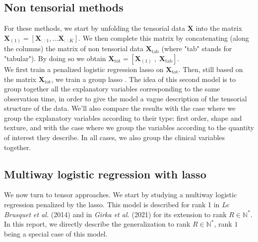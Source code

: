 \documentclass[10pt]{article}
\begin{document}
\subsection{Non tensorial methods}
For these methods, we start by unfolding the tensorial data $\underline{\mathbf{X}}$ into the matrix $\mathbf{X}_{(1)} = [\mathbf{X}_{:\,:1}, \ldots \mathbf{X}_{:\,:K}]$. We then complete this matrix  by concatenating (along the columns) the matrix of non tensorial data $\mathbf{X}_{\text{tab}}$ (where "tab" stands for "tabular"). By doing so we obtain $\mathbf{X}_{\text{tot}} = [\mathbf{X}_{(1)}  \; , \; \mathbf{X}_{\text{tab}}]$.\\
\indent We first train a penalized logistic regression lasso on $\mathbf{X}_{\text{tot}}$. Then, still based on the matrix $\mathbf{X}_{\text{tot}}$, we train a group lasso \cite{grp_lasso}. The idea of this second model is to group together all the explanatory variables corresponding to the same observation time, in order to give the model a vague description of the tensorial structure of the data. We'll also compare the results with the case where we group the explanatory variables according to their type: first order, shape and texture, and with the case where we group the variables according to the quantity of interest they describe. In all cases, we also group the clinical variables together.

\subsection{Multiway logistic regression with lasso}
\indent We now turn to tensor approaches. We start by studying a multiway logistic regression penalized by the lasso. This model is described for rank 1 in \textit{Le Brusquet et al.} (2014) \cite{multi_rank_1} and in \textit{Girka et al.} (2021) \cite{multi_rank_r} for its extension to rank $R \in \mathbb{N}^{*}$. In this report, we directly describe the generalization to rank $R \in \mathbb{N}^{*}$, rank $1$ being a special case of this model.\\[5 pt]
\end{document}
